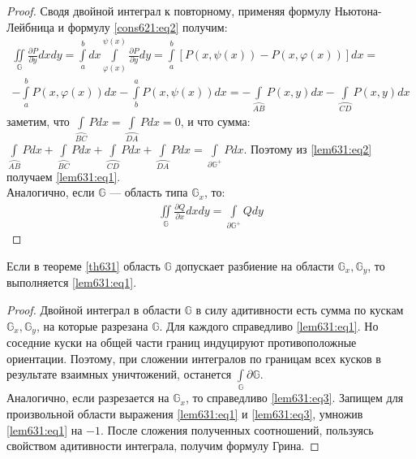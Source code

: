 \begin{proof}
  Сводя двойной интеграл к повторному, применяя формулу Ньютона-Лейбница и
  формулу \eqref{cons621:eq2} получим:
  \begin{gather}
    \iint\limits_{\mathbb{G}} \frac{\partial P}{\partial y} dx dy =
    \int\limits_a^b dx \int\limits_{\varphi(x)}^{\psi(x)} \frac{\partial
    P}{\partial y} dy = \int\limits_a^b \left[P(x, \psi(x)) - P(x,
    \varphi(x))\right] dx = \\
    -\int\limits_a^b P(x, \varphi(x)) dx - \int\limits_b^a P(x, \psi(x)) dx =
    -\int\limits_{\wideparen{AB}} P(x, y) dx - \int\limits_{\wideparen{CD}}
    P(x, y) dx
    \label{lem631:eq2}
  \end{gather}
  заметим, что $\int\limits_{\wideparen{BC}} Pdx = \int\limits_{\wideparen{DA}}
  Pdx = 0$, и что сумма: $\int\limits_{\wideparen{AB}} Pdx +
  \int\limits_{\wideparen{BC}} Pdx + \int\limits_{\wideparen{CD}} Pdx +
  \int\limits_{\wideparen{DA}} Pdx = \int\limits_{\partial \mathbb{G}^+} Pdx$.
  Поэтому из \eqref{lem631:eq2} получаем \eqref{lem631:eq1}. \\
  Аналогично, если $\mathbb{G}$ --- область типа $\mathbb{G}_x$, то:
  \begin{gather}
    \iint\limits_{\mathbb{G}} \frac{\partial Q}{\partial x} dx dy =
    \int\limits_{\partial \mathbb{G}^+} Qdy
    \label{lem631:eq3}
  \end{gather}
\end{proof}

\begin{lemma}
  Если в теореме \eqref{th631} область $\mathbb{G}$ допускает разбиение на
  области $\mathbb{G}_x, \mathbb{G}_y$, то выполняется \eqref{lem631:eq1}.
\end{lemma}

\begin{proof}
  Двойной интеграл в области $\mathbb{G}$ в силу адитивности есть сумма по
  кускам $\mathbb{G}_x, \mathbb{G}_y$, на которые разрезана $\mathbb{G}$. Для
  каждого справедливо \eqref{lem631:eq1}. Но соседние куски на общей части
  границ индуцируют противоположные ориентации. Поэтому, при сложении
  интегралов по границам всех кусков в результате взаимных уничтожений,
  останется $\int\limits_{\mathbb{G}} \partial \mathbb{G}$. \\
  Аналогично, если разрезается на $\mathbb{G}_x$, то справедливо
  \eqref{lem631:eq3}. Запищем для произвольной области выражения
  \eqref{lem631:eq1} и \eqref{lem631:eq3}, умножив \eqref{lem631:eq1} на $-1$.
  После сложения полученных соотношений, пользуясь свойством адитивности
  интеграла, получим формулу Грина.
\end{proof}

